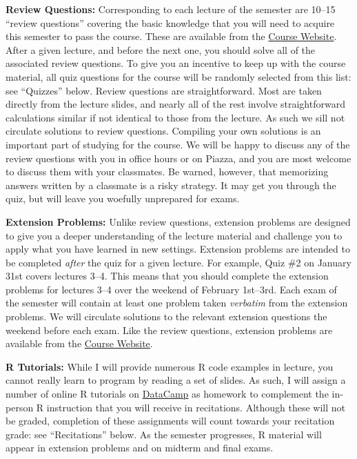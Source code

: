 \documentclass[11pt, letterpaper]{article}
\begin{document}
\medskip
\noindent \textbf{Review Questions:} 
Corresponding to each lecture of the semester are 10--15 ``review questions'' covering the basic knowledge that you will need to acquire this semester to pass the course.
These are available from the \href{http://ditraglia.com/Econ103Public}{Course Website}.
After a given lecture, and before the next one, you should solve all of the associated review questions. 
To give you an incentive to keep up with the course material, all quiz questions for the course will be randomly selected from this list: see ``Quizzes'' below.
Review questions are straightforward.
Most are taken directly from the lecture slides, and nearly all of the rest involve straightforward calculations similar if not identical to those from the lecture.
As such we sill not circulate solutions to review questions.
Compiling your own solutions is an important part of studying for the course.
We will be happy to discuss any of the review questions with you in office hours or on Piazza, and you are most welcome to discuss them with your classmates.
Be warned, however, that memorizing answers written by a classmate is a risky strategy.
It may get you through the quiz, but will leave you woefully unprepared for exams.

\medskip
\noindent \textbf{Extension Problems:} 
Unlike review questions, extension problems are designed to give you a deeper understanding of the lecture material and challenge you to apply what you have learned in new settings.
Extension problems are intended to be completed \emph{after} the quiz for a given lecture. 
For example, Quiz \#2 on January 31st covers lectures 3--4. 
This means that you should complete the extension problems for lectures 3--4 over the weekend of February 1st--3rd.
Each exam of the semester will contain at least one problem taken \emph{verbatim} from the extension problems.
We will circulate solutions to the relevant extension questions the weekend before each exam.
Like the review questions, extension problems are available from the \href{http://ditraglia.com/Econ103Public}{Course Website}.

\medskip
\noindent \textbf{R Tutorials:}
While I will provide numerous R code examples in lecture, you cannot really learn to program by reading a set of slides.
As such, I will assign a number of online R tutorials on \href{https://datacamp.com}{DataCamp} as homework to complement the in-person R instruction that you will receive in recitations.
Although these will not be graded, completion of these assignments will count towards your recitation grade: see ``Recitations'' below.
As the semester progresses, R material will appear in extension problems and on midterm and final exams.
\end{document}
